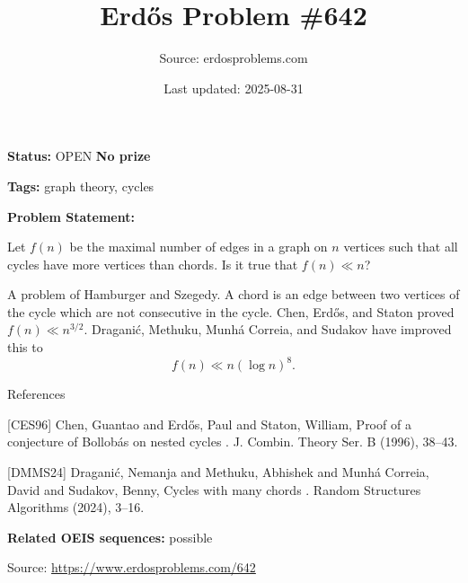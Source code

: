 \documentclass{article}
\title{Erd\H{o}s Problem \#642}
\date{Last updated: 2025-08-31}
\author{Source: erdosproblems.com}
\begin{document}
\maketitle

\noindent\textbf{Status:} OPEN \quad \textbf{No prize}

\noindent\textbf{Tags:} graph theory, cycles

\medskip

\noindent\textbf{Problem Statement:}

Let $f(n)$ be the maximal number of edges in a graph on $n$ vertices such that all cycles have more vertices than chords. Is it true that $f(n)\ll n$?




A problem of Hamburger and Szegedy. A chord is an edge between two vertices of the cycle which are not consecutive in the cycle. Chen, Erd\H{o}s, and Staton \cite{CES96} proved $f(n) \ll n^{3/2}$. Dragani\'{c}, Methuku, Munh\'{a} Correia, and Sudakov \cite{DMMS24} have improved this to\[f(n) \ll n(\log n)^8.\]




References

[CES96] Chen, Guantao and Erd\H{o}s, Paul and Staton, William, Proof of a conjecture of {B}ollob\'{a}s on nested cycles . J. Combin. Theory Ser. B (1996), 38--43.

[DMMS24] Dragani\'c, Nemanja and Methuku, Abhishek and Munh\'{a}{} Correia, David and Sudakov, Benny, Cycles with many chords . Random Structures Algorithms (2024), 3--16.

\noindent\textbf{Related OEIS sequences:} possible


\bigskip
\noindent\small{Source: \url{https://www.erdosproblems.com/642}}
\end{document}
